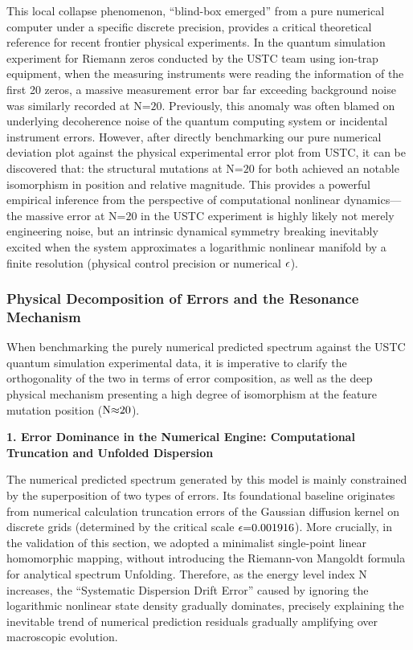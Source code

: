 \documentclass[fleqn,10pt]{wlscirep}
\begin{document}
This local collapse phenomenon, ``blind-box emerged'' from a pure
numerical computer under a specific discrete precision, provides a
critical theoretical reference for recent frontier physical experiments.
In the quantum simulation experiment for Riemann zeros conducted by the
USTC team using ion-trap equipment, when the measuring instruments were
reading the information of the first 20 zeros, a massive measurement
error bar far exceeding background noise was similarly recorded at
\(\text{N}\text{=20}\). Previously, this anomaly was often blamed on
underlying decoherence noise of the quantum computing system or
incidental instrument errors. However, after directly benchmarking our
pure numerical deviation plot against the physical experimental error
plot from USTC, it can be discovered that: the structural mutations at
\(\text{N}\text{=20}\) for both achieved an notable isomorphism in
position and relative magnitude. This provides a powerful empirical
inference from the perspective of computational nonlinear dynamics---the
massive error at \(\text{N}\text{=20}\) in the USTC experiment is highly
likely not merely engineering noise, but an intrinsic dynamical symmetry
breaking inevitably excited when the system approximates a logarithmic
nonlinear manifold by a finite resolution (physical control precision or
numerical \(\text{\ensuremath{\epsilon}}\)).

\subsubsection*{Physical Decomposition of Errors and the Resonance Mechanism}

When benchmarking the purely numerical predicted spectrum against the
USTC quantum simulation experimental data, it is imperative to clarify
the orthogonality of the two in terms of error composition, as well as
the deep physical mechanism presenting a high degree of isomorphism at
the feature mutation position (\(\text{N}\text{\ensuremath{\approx}20}\)).

\textbf{1. Error Dominance in the Numerical Engine: Computational
Truncation and Unfolded Dispersion}

The numerical predicted spectrum generated by this model is mainly
constrained by the superposition of two types of errors. Its
foundational baseline originates from numerical calculation truncation
errors of the Gaussian diffusion kernel on discrete grids (determined by
the critical scale \(\text{\ensuremath{\epsilon}=0.001916}\)). More crucially, in the
validation of this section, we adopted a minimalist single-point linear
homomorphic mapping, without introducing the Riemann-von Mangoldt
formula for analytical spectrum Unfolding. Therefore, as the energy
level index \(\text{N}\) increases, the ``Systematic Dispersion Drift
Error'' caused by ignoring the logarithmic nonlinear state density
gradually dominates, precisely explaining the inevitable trend of
numerical prediction residuals gradually amplifying over macroscopic
evolution.
\end{document}

